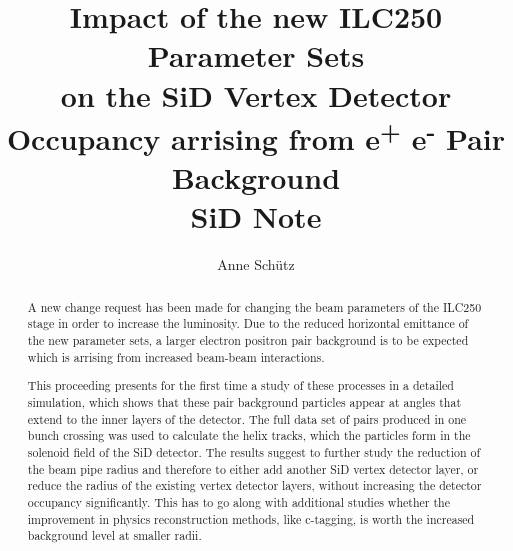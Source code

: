 \documentclass[12pt]{article}
\newcommand{\sid}{SiD\xspace}
\newcommand{\electron}{e\textsuperscript{-}\xspace}
\newcommand{\positron}{e\textsuperscript{+}\xspace}
\begin{document}

\title{Impact of the new ILC250 Parameter Sets\\on the \sid Vertex Detector Occupancy arrising from \positron\electron Pair Background\vspace*{0.3cm}\\{\normalsize \sid Note}}

\author[1,2]{Anne Sch\"utz}


\maketitle


\begin{abstract}
A new change request has been made for changing the beam parameters of the ILC250 stage in order to increase the luminosity.
Due to the reduced horizontal emittance of the new parameter sets, a larger electron positron pair background is to be expected which is arrising from increased beam-beam interactions.

This proceeding presents for the first time a study of these processes in a detailed simulation, which shows that these pair background particles appear at angles that extend to the inner layers of the detector.
The full data set of pairs produced in one bunch crossing was used to calculate the helix tracks, which the particles form in the solenoid field of the SiD detector.
The results suggest to further study the reduction of the beam pipe radius and therefore to either add another SiD vertex detector layer, or reduce the radius of the existing vertex detector layers, without increasing the detector occupancy significantly.
This has to go along with additional studies whether the improvement in physics reconstruction methods, like c-tagging, is worth the increased background level at smaller radii.
\end{abstract}


\end{document}
